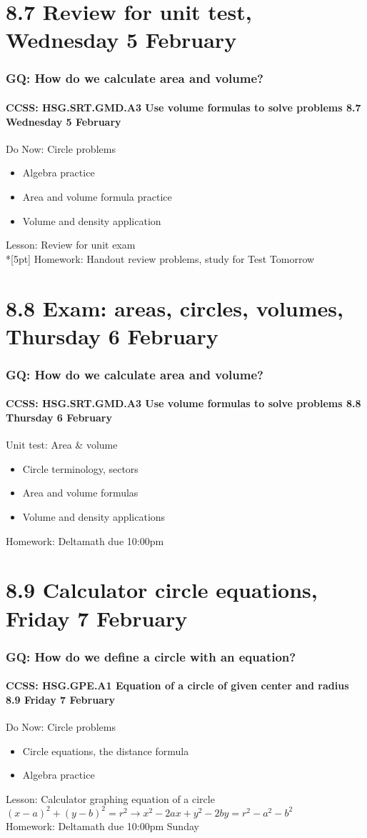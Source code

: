 \documentclass{beamer}
\begin{document}
\section{8.7 Review for unit test, Wednesday 5 February}
\frame
{
  \frametitle{GQ: How do we calculate area and volume?}
  \framesubtitle{CCSS: HSG.SRT.GMD.A3 Use volume formulas to solve problems \hfill \alert{8.7 Wednesday 5 February}}

  \begin{block}{Do Now: Circle problems}
  \begin{itemize}
    \item Algebra practice
    \item Area and volume formula practice
    \item Volume and density application
  \end{itemize}
  \end{block}
  Lesson: Review for unit exam\\*[5pt]
  Homework: Handout review problems, study for \alert{Test Tomorrow}
}

\section{8.8 Exam: areas, circles, volumes, Thursday 6 February}
\frame
{
  \frametitle{GQ: How do we calculate area and volume?}
  \framesubtitle{CCSS: HSG.SRT.GMD.A3 Use volume formulas to solve problems \hfill \alert{8.8 Thursday 6 February}}

  \begin{block}{Unit test: Area \& volume}
  \begin{itemize}
    \item Circle terminology, sectors
    \item Area and volume formulas
    \item Volume and density applications
  \end{itemize}
  \end{block}
  Homework: Deltamath due 10:00pm
}

\section{8.9 Calculator circle equations, Friday 7 February}
\frame
{
  \frametitle{GQ: How do we define a circle with an equation?}
  \framesubtitle{CCSS: HSG.GPE.A1 Equation of a circle of given center and radius \hfill \alert{8.9 Friday 7 February}}

  \begin{block}{Do Now: Circle problems}
  \begin{itemize}
    \item Circle equations, the distance formula
    \item Algebra practice
  \end{itemize}
  \end{block}
  Lesson: Calculator graphing equation of a circle $(x-a)^2+(y-b)^2=r^2 \rightarrow x^2-2ax+y^2-2by=r^2-a^2-b^2$\\[5pt]
  Homework: Deltamath due 10:00pm Sunday
}
\end{document}
